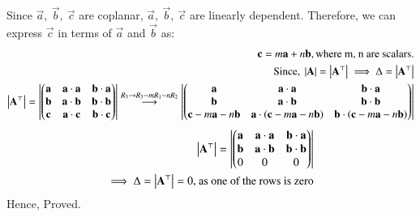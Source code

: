\documentclass[journal,12pt,onecolumn]{IEEEtran}
\theoremstyle{remark}
\begin{document}
Since $\vec{a}, \ \vec{b}, \ \vec{c}$ are coplanar, $\vec{a}, \ \vec{b}, \ \vec{c}$ are linearly dependent. Therefore, we can express $\vec{c}$ in terms of $\vec{a}$ and $\vec{b}$ as:
\begin{align}
    \mathbf{c}=m\mathbf{a}+n\mathbf{b}, \text{where m, n are scalars.}\\
    \text{Since, }\left\vert\mathbf{A}\right\vert=\left\vert\mathbf{A}^{\top}\right\vert \implies \Delta=\left\vert\mathbf{A}^{\top}\right\vert\\
    \left\vert\mathbf{A}^{\top}\right\vert=\left\vert\begin{pmatrix}
                        \mathbf{a} & \mathbf{a}\cdot \mathbf{a} & \mathbf{b}\cdot \mathbf{a}\\
                        \mathbf{b}& \mathbf{a}\cdot \mathbf{b} & \mathbf{b}\cdot \mathbf{b}\\
                        \mathbf{c}& \mathbf{a}\cdot \mathbf{c} & \mathbf{b}\cdot \mathbf{c} 
                  \end{pmatrix}\right\vert \overset{R_3 \rightarrow R_3 - m R_1 - n R_2}{\longrightarrow}
    \left\vert\begin{pmatrix}
                \mathbf{a} & \mathbf{a}\cdot \mathbf{a} & \mathbf{b}\cdot \mathbf{a}\\
                \mathbf{b}& \mathbf{a}\cdot \mathbf{b} & \mathbf{b}\cdot \mathbf{b}\\
                \mathbf{c}-m\mathbf{a}-n\mathbf{b}& \mathbf{a}\cdot \left(\mathbf{c}-m\mathbf{a}-n\mathbf{b}\right) & \mathbf{b}\cdot \left(\mathbf{c}-m\mathbf{a}-n\mathbf{b}\right)
            \end{pmatrix}\right\vert
\end{align}
\begin{align}
    \left\vert\mathbf{A}^{\top}\right\vert=\left\vert\begin{pmatrix}
                        \mathbf{a} & \mathbf{a}\cdot \mathbf{a} & \mathbf{b}\cdot \mathbf{a}\\
                        \mathbf{b}& \mathbf{a}\cdot \mathbf{b} & \mathbf{b}\cdot \mathbf{b}\\
                        0& 0& 0 
                  \end{pmatrix}\right\vert\\
    \implies \Delta = \left\vert\mathbf{A}^{\top}\right\vert=0 \text{, as one of the rows is zero}
\end{align} 
Hence, Proved.
\end{document}
